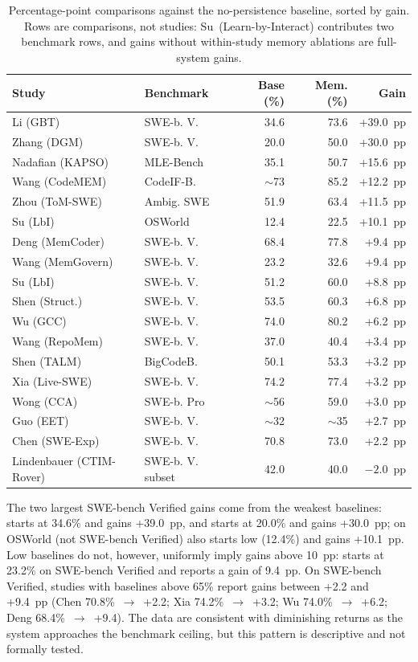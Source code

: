 \begin{table}[htbp]
  \centering
  \caption{Percentage-point comparisons against the no-persistence
    baseline, sorted by gain.
    Rows are comparisons, not studies:
    Su~(Learn-by-Interact) contributes two benchmark rows, and gains
    without within-study memory ablations are full-system gains.}
  \label{tab:performance}
  \begin{tabular}{l l r r r}
    \toprule
    Study & Benchmark & Base (\%) & Mem. (\%) & Gain \\
    \midrule
    Li (GBT) & SWE-b. V. & 34.6 & 73.6 & +39.0~pp \\
    Zhang (DGM) & SWE-b. V. & 20.0 & 50.0 & +30.0~pp \\
    Nadafian (KAPSO) & MLE-Bench & 35.1 & 50.7 & +15.6~pp \\
    Wang (CodeMEM) & CodeIF-B. & $\sim$73 & 85.2 & +12.2~pp \\
    Zhou (ToM-SWE) & Ambig. SWE & 51.9 & 63.4 & +11.5~pp \\
    Su (LbI) & OSWorld & 12.4 & 22.5 & +10.1~pp \\
    Deng (MemCoder) & SWE-b. V. & 68.4 & 77.8 & +9.4~pp \\
    Wang (MemGovern) & SWE-b. V. & 23.2 & 32.6 & +9.4~pp \\
    Su (LbI) & SWE-b. V. & 51.2 & 60.0 & +8.8~pp \\
    Shen (Struct.) & SWE-b. V. & 53.5 & 60.3 & +6.8~pp \\
    Wu (GCC) & SWE-b. V. & 74.0 & 80.2 & +6.2~pp \\
    Wang (RepoMem) & SWE-b. V. & 37.0 & 40.4 & +3.4~pp \\
    Shen (TALM) & BigCodeB. & 50.1 & 53.3 & +3.2~pp \\
    Xia (Live-SWE) & SWE-b. V. & 74.2 & 77.4 & +3.2~pp \\
    Wong (CCA) & SWE-b. Pro & $\sim$56 & 59.0 & +3.0~pp \\
    Guo (EET) & SWE-b. V. & $\sim$32 & $\sim$35 & +2.7~pp \\
    Chen (SWE-Exp) & SWE-b. V. & 70.8 & 73.0 & +2.2~pp \\
    Lindenbauer (CTIM-Rover) & SWE-b. V. subset & 42.0 & 40.0 & $-2.0$~pp \\
    \bottomrule
  \end{tabular}
\end{table}

The two largest SWE-bench Verified gains come from the weakest
baselines: \citet{li2026traversalaspolicy} starts at 34.6\% and gains
+39.0~pp, and \citet{zhang2025darwingodel} starts at 20.0\% and gains
+30.0~pp;
\citet{su2025learnbyinteract} on OSWorld (not SWE-bench Verified) also
starts low (12.4\%) and gains +10.1~pp.
Low baselines do not, however, uniformly imply gains above 10~pp:
\citet{wang2026memgovern} starts at 23.2\% on SWE-bench Verified and
reports a gain of 9.4~pp.
On SWE-bench Verified, studies with baselines above 65\% report gains
between +2.2 and +9.4~pp (Chen 70.8\%~$\to$~+2.2; Xia 74.2\%~$\to$~+3.2;
Wu 74.0\%~$\to$~+6.2; Deng 68.4\%~$\to$~+9.4).
The data are consistent with diminishing returns as the system
approaches the benchmark ceiling, but this pattern is descriptive and
not formally tested.

